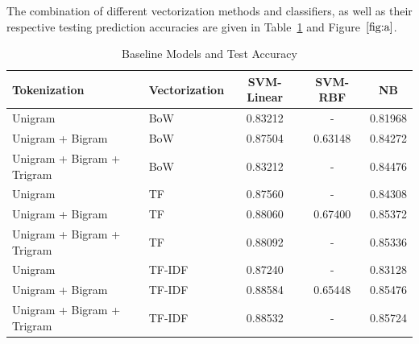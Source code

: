 \documentclass{article}
\begin{document}
The combination of different vectorization methods and classifiers, as well as their respective testing prediction accuracies are given in Table~\ref{tab:a} and Figure~$\ref{fig:a}$.

\begin{table}[h]
   \centering
  \begin{tabular}{ l l|| c | c | c} 
     \toprule
    Tokenization  & Vectorization & SVM-Linear & SVM-RBF & NB \\

    \midrule
    Unigram  & BoW  & 0.83212      & -    & 0.81968    \\
    Unigram + Bigram & BoW & 0.87504       & 0.63148     & 0.84272      \\
    Unigram + Bigram + Trigram & BoW  & 0.83212      & -     & 0.84476  \\
    Unigram  & TF  & 0.87560      & -    & 0.84308    \\
    Unigram + Bigram & TF & 0.88060       & 0.67400     & 0.85372      \\
    Unigram + Bigram + Trigram & TF  & 0.88092     & -     & 0.85336  \\
    Unigram  & TF-IDF  & 0.87240      & -    & 0.83128    \\
    Unigram + Bigram & TF-IDF & 0.88584       & 0.65448     & 0.85476      \\
    Unigram + Bigram + Trigram & TF-IDF  & 0.88532     & -     & 0.85724  \\
    \bottomrule
  \end{tabular}
   \caption{Baseline Models and Test Accuracy}\label{tab:a}
\end{table}
\end{document}
